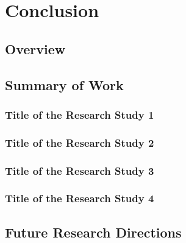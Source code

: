 \chapter{Conclusion}
\label{chap:conclusion} 

\section{Overview}

\lipsum[1]

\section{Summary of Work}

\subsection{Title of the Research Study 1}

\lipsum[1]

\subsection{Title of the Research Study 2}

\lipsum[1]


\subsection{Title of the Research Study 3}

\lipsum[1]

\subsection{Title of the Research Study 4}

\lipsum[1]

\section{Future Research Directions}

\lipsum[2-3]

